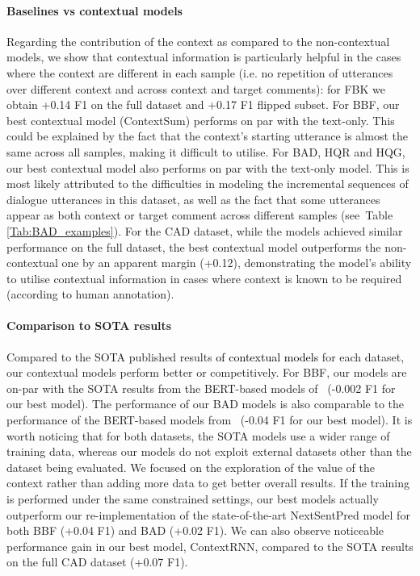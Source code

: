 \documentclass[acmsmall]{acmart}
\newcommand{\red}[1]{\textcolor{black}{#1}}
\begin{document}
\paragraph{Baselines vs contextual models}
Regarding the contribution of the context as compared to the non-contextual models, we show that contextual information is particularly helpful in the cases where the context are different in each sample (i.e. no repetition of utterances over different context and across context and target comments): for FBK we obtain +0.14 F1 on the full dataset and +0.17 F1 flipped subset. For BBF, our best contextual model (ContextSum) performs on par with the text-only. This could be explained by the fact that the context's starting utterance is almost the same across all samples, making it difficult to utilise. For BAD, HQR and HQG, our best contextual model also performs on par with the text-only model. This is most likely attributed to the difficulties in modeling the incremental sequences of dialogue utterances in this dataset, as well as the fact that some utterances appear as both context or target comment across different samples (see~Table \ref{Tab:BAD_examples}). For the CAD dataset, while the models achieved similar performance on the full dataset, the best contextual model outperforms the non-contextual one by an apparent margin (+0.12), demonstrating the model's ability to utilise contextual information in cases where context is known to be required (according to human annotation).

\paragraph{Comparison to SOTA results} Compared to the SOTA published results \red{of contextual models} for each dataset, our contextual models perform better or competitively. For BBF, our models are on-par with the SOTA results from the BERT-based models of~\cite{dialogue_safety} (-0.002 F1 for our best model). The performance of our BAD models is also comparable to the performance of the BERT-based models from~\cite{xu-etal-2021-bot} (-0.04 F1 for our best model). It is worth noticing that for both datasets, the SOTA models use a wider range of training data, whereas our models do not exploit external datasets other than the dataset being evaluated. We focused on the exploration of the value of the context rather than adding more data to get better overall results.
If the training is performed under the same constrained settings, our best models actually outperform our re-implementation of the state-of-the-art NextSentPred model for both BBF (+0.04 F1) and BAD (+0.02 F1). We can also observe noticeable performance gain in our best model, ContextRNN, compared to the SOTA results on the full CAD dataset (+0.07 F1).
\end{document}
